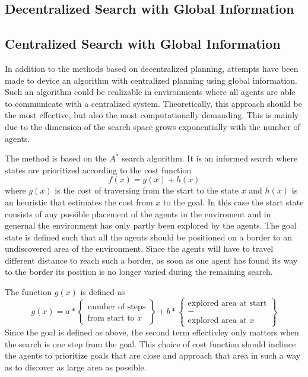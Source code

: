 \documentclass{article}
\begin{document}
\subsection{Decentralized Search with Global Information}

\subsection{Centralized Search with Global Information}
In addition to the methods based on decentralized planning, attempts have been
made to device an algorithm with centralized planning using global information.
Such an algorithm could be realizable in environments where all agents are able
to communicate with a centralized system. Theoretically, this approach should
be the most effective, but also the most computationally demanding. This is
mainly due to the dimension of the search space grows exponentially with the
number of agents.

The method is based on the $A^*$ search algorithm. It is an informed search
where states are prioritized according to the cost function
%
$$f(x) = g(x) + h(x)$$
%
where $g(x)$ is the cost of traversing from the start to the state $x$ and
$h(x)$ is an heuristic that estimates the cost from $x$ to the goal. In this
case the start state consists of any possible placement of the agents in the
enviroment and in genernal the environment has only partly been explored by the
agents. The goal state is defined such that all the agents should be positioned
on a border to an undiscovered area of the environment. Since the agents will
have to travel different distance to reach such a border, as soon as one agent 
has found its way to the border its position is no longer varied during the 
remaining search.

The function $g(x)$ is defined as
%
$$g(x) = a * \begin{Bmatrix} \text{number of steps} \\ \text{from start to $x$}
\end{Bmatrix} + b * \begin{Bmatrix} \text{explored area at start} \\ - \\ \text{
explored area at $x$} \end{Bmatrix}$$
%
Since the goal is defined as above, the second term effectivley only matters
when the search is one step from the goal. This choice of cost function should
inclince the agents to prioritize goals that are close and approach that area in
such a way as to discover as large area as possible.
\end{document}
